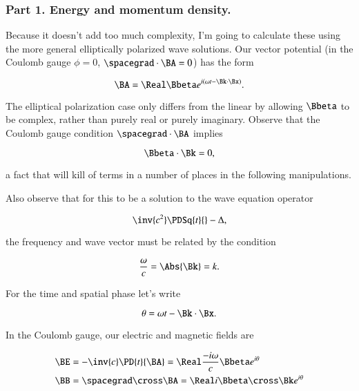 \subsubsection{Part 1.  Energy and momentum density.}

Because it doesn't add too much complexity, I'm going to calculate these using the more general elliptically polarized wave solutions.  Our vector potential (in the Coulomb gauge $\phi = 0$, $\spacegrad \cdot \BA = 0$) has the form

\begin{equation}\label{eqn:relElectroDynProblemSet4:10}
\BA = \Real \Bbeta e^{i (\omega t - \Bk \cdot \Bx) }.
\end{equation}

The elliptical polarization case only differs from the linear by allowing $\Bbeta$ to be complex, rather than purely real or purely imaginary.  Observe that the Coulomb gauge condition $\spacegrad \cdot \BA$ implies

\begin{equation}\label{eqn:relElectroDynProblemSet4:30}
\Bbeta \cdot \Bk = 0,
\end{equation}

a fact that will kill of terms in a number of places in the following manipulations.

Also observe that for this to be a solution to the wave equation operator

\begin{equation}\label{eqn:relElectroDynProblemSet4:50}
\inv{c^2} \PDSq{t}{} - \Delta,
\end{equation}

the frequency and wave vector must be related by the condition

\begin{equation}\label{eqn:relElectroDynProblemSet4:70}
\frac{\omega}{c} = \Abs{\Bk} = k.
\end{equation}

For the time and spatial phase let's write

\begin{equation}\label{eqn:relElectroDynProblemSet4:90}
\theta = \omega t - \Bk \cdot \Bx.
\end{equation}

In the Coulomb gauge, our electric and magnetic fields are

\begin{align}\label{eqn:relElectroDynProblemSet4:110}
\BE &= -\inv{c}\PD{t}{\BA} = \Real \frac{-i\omega}{c} \Bbeta e^{i\theta} \\
\BB &= \spacegrad \cross \BA = \Real i \Bbeta \cross \Bk e^{i\theta}
\end{align}

